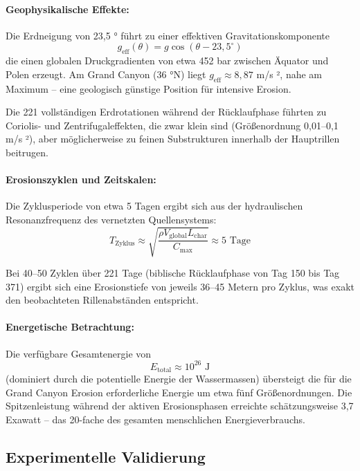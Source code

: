﻿\documentclass[12pt,a4paper]{report}
\begin{document}
\paragraph{Geophysikalische Effekte:}
Die Erdneigung von 23,5 ° führt zu einer effektiven Gravitationskomponente
\begin{equation}
	g_{\text{eff}}(\theta) = g \cos(\theta - 23{,}5^\circ)
\end{equation}
die einen globalen Druckgradienten von etwa 452 bar zwischen Äquator und Polen erzeugt. Am Grand Canyon (36 °N) liegt $g_{\text{eff}} \approx 8{,}87$ m/s ², nahe am Maximum -- eine geologisch günstige Position für intensive Erosion.

Die 221 vollständigen Erdrotationen während der Rücklaufphase führten zu Coriolis- und Zentrifugaleffekten, die zwar klein sind (Größenordnung 0,01--0,1 m/s ²), aber möglich\-erweise zu feinen Substrukturen innerhalb der Hauptrillen beitrugen.

\paragraph{Erosionszyklen und Zeitskalen:}
Die Zyklusperiode von etwa 5 Tagen ergibt sich aus der hydraulischen Resonanzfrequenz des vernetzten Quellensystems:
\begin{equation}
	T_{\text{Zyklus}} \approx \sqrt{\frac{\rho V_{\text{global}} L_{\text{char}}}{C_{\text{max}}}} \approx 5 \text{ Tage}
\end{equation}

Bei 40--50 Zyklen über 221 Tage (biblische Rücklaufphase von Tag 150 bis Tag 371) ergibt sich eine Erosionstiefe von jeweils 36--45 Metern pro Zyklus, was exakt den beobachteten Rillenabständen entspricht.

\paragraph{Energetische Betrachtung:}
Die verfügbare Gesamtenergie von
\begin{equation}
	E_{\text{total}} \approx 10^{26} \text{ J}
\end{equation}
(dominiert durch die potentielle Energie der Wassermassen) übersteigt die für die Grand Canyon Erosion erforderliche Energie um etwa fünf Größenordnungen. Die Spitzenleistung während der aktiven Erosionsphasen erreichte schätzungsweise 3,7 Exawatt -- das 20-fache des gesamten menschlichen Energieverbrauchs.

\subsection{Experimentelle Validierung}
\end{document}
